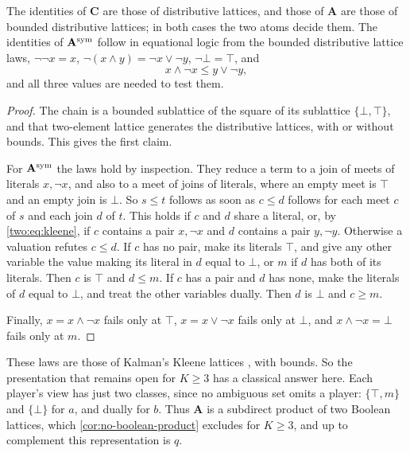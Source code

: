 \begin{proposition}[Presentation]\label{two:prop:basis}
The identities of $\mathbf C$ are those of distributive lattices, and those of $\mathbf A$ are those of bounded distributive lattices; in both cases the two atoms decide them. The identities of $\mathbf A^{\rm sym}$ follow in equational logic from the bounded distributive lattice laws, $\lnot\lnot x=x$, $\lnot(x\land y)=\lnot x\lor\lnot y$, $\lnot\bot=\top$, and
\begin{equation}\label{two:eq:kleene}
 x\land\lnot x\leq y\lor\lnot y,
\end{equation}
and all three values are needed to test them.
\end{proposition}
\begin{proof}
The chain is a bounded sublattice of the square of its sublattice $\{\bot,\top\}$, and that two-element lattice generates the distributive lattices, with or without bounds. This gives the first claim.

For $\mathbf A^{\rm sym}$ the laws hold by inspection. They reduce a term to a join of meets of literals $x,\lnot x$, and also to a meet of joins of literals, where an empty meet is $\top$ and an empty join is $\bot$. So $s\leq t$ follows as soon as $c\leq d$ follows for each meet $c$ of $s$ and each join $d$ of $t$. This holds if $c$ and $d$ share a literal, or, by \eqref{two:eq:kleene}, if $c$ contains a pair $x,\lnot x$ and $d$ contains a pair $y,\lnot y$. Otherwise a valuation refutes $c\leq d$. If $c$ has no pair, make its literals $\top$, and give any other variable the value making its literal in $d$ equal to $\bot$, or $m$ if $d$ has both of its literals. Then $c$ is $\top$ and $d\leq m$. If $c$ has a pair and $d$ has none, make the literals of $d$ equal to $\bot$, and treat the other variables dually. Then $d$ is $\bot$ and $c\geq m$.

Finally, $x=x\land\lnot x$ fails only at $\top$, $x=x\lor\lnot x$ fails only at $\bot$, and $x\land\lnot x=\bot$ fails only at $m$.
\end{proof}

These laws are those of Kalman's Kleene lattices \cite{Kalman1958}, with bounds. So the presentation that remains open for $K\geq3$ has a classical answer here. Each player's view has just two classes, since no ambiguous set omits a player: $\{\top,m\}$ and $\{\bot\}$ for $a$, and dually for $b$. Thus $\mathbf A$ is a subdirect product of two Boolean lattices, which \cref{cor:no-boolean-product} excludes for $K\geq3$, and up to complement this representation is $q$.

